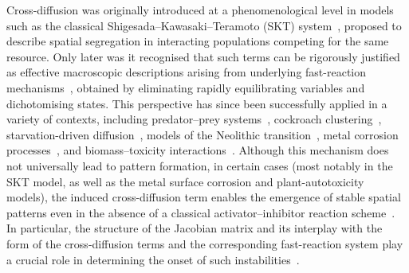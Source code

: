 \documentclass[a4paper,10pt,abstract=true,parskip=true]{scrartcl}
\theoremstyle{remark}
\numberwithin{equation}{section}
\numberwithin{thm}{section}
\begin{document}
Cross-diffusion was originally introduced at a phenomenological level in models such as the classical Shigesada--Kawasaki--Teramoto (SKT) system~\cite{SKT}, proposed to describe spatial segregation in interacting populations competing for the same resource. Only later was it recognised that such terms can be rigorously justified as effective macroscopic descriptions arising from underlying fast-reaction mechanisms~\cite{DesvillettesRDM, Desvillettes2015, IMN}, obtained by eliminating rapidly equilibrating variables and dichotomising states.
This perspective has since been successfully applied in a variety of contexts, including predator–prey systems~\cite{ConfortoDesSoresina2018, DesvillettesFiorentinoMautone, DesvillettesSoresina, IIR}, cockroach clustering~\cite{cockroaches}, starvation-driven diffusion~\cite{Brocchieri2025, BrocchieriDesvillettes}, models of the Neolithic transition~\cite{Elias2018}, metal corrosion processes~\cite{Corrosione}, and biomass–toxicity interactions~\cite{GIS_2026}.
Although this mechanism does not universally lead to pattern formation, in certain cases (most notably in the SKT model, as well as the metal surface corrosion and plant-autotoxicity models), the induced cross-diffusion term enables the emergence of stable spatial patterns even in the absence of a classical activator–inhibitor reaction scheme~\cite{Breden2019}. In particular, the structure of the Jacobian matrix and its interplay with the form of the cross-diffusion terms and the corresponding fast-reaction system play a crucial role in determining the onset of such instabilities~\cite{BrocchieriSoresina}.
\end{document}
